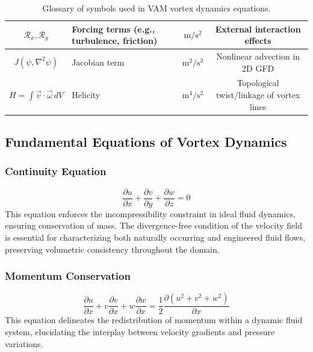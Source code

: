 \documentclass[a4paper,12pt]{article}
\begin{document}
\begin{table}[H]
\begin{tabular}{|c|l|c|c|}
            $\mathcal{R}_x, \mathcal{R}_y$ & Forcing terms (e.g., turbulence, friction) & $\mathrm{m/s^2}$ & External interaction effects \\
            \hline
            $J(\psi, \nabla^2\psi)$ & Jacobian term & $\mathrm{m^2/s^3}$ & Nonlinear advection in 2D GFD \\
            \hline
            $H = \int \vec{v} \cdot \vec{\omega} \, dV$ & Helicity & $\mathrm{m^4/s^2}$ & Topological twist/linkage of vortex lines \\
            \hline
        \end{tabular}
        \caption{Glossary of symbols used in VAM vortex dynamics equations.}
        \label{tab:vam_vorticity_symbols}
    \end{table}


    \subsection{Fundamental Equations of Vortex Dynamics}

    \subsubsection*{Continuity Equation}
    \begin{equation*}
        \frac{\partial u}{\partial x} + \frac{\partial v}{\partial y} + \frac{\partial w}{\partial z} = 0
    \end{equation*}
    This equation enforces the incompressibility constraint in ideal fluid dynamics, ensuring conservation of mass. The divergence-free condition of the velocity field is essential for characterizing both naturally occurring and engineered fluid flows, preserving volumetric consistency throughout the domain.

    \subsubsection*{Momentum Conservation}
    \begin{equation*}
        \frac{\partial u}{\partial x} + v \frac{\partial v}{\partial x} + w \frac{\partial w}{\partial x} = \frac{1}{2} \frac{\partial (u^2 + v^2 + w^2)}{\partial x}
    \end{equation*}
    This equation delineates the redistribution of momentum within a dynamic fluid system, elucidating the interplay between velocity gradients and pressure variations.
\end{document}
